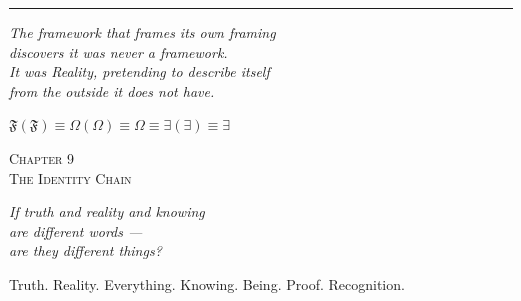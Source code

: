 \documentclass[10pt, openany, oneside]{book}
\renewcommand{\large}{\fontsize{11.5}{14}\selectfont}
\renewcommand{\huge}{\fontsize{17}{21}\selectfont}
\begin{document}
\begin{center}
    \rule{0.15\textwidth}{0.3pt}
\end{center}

\vspace{0.5em}

\begin{center}
    \itshape
    The framework that frames its own framing\\
    discovers it was never a framework.\\[0.8em]
    It was Reality, pretending to describe itself\\
    from the outside it does not have.
\end{center}

\vspace{0.5em}

\begin{center}
    $\mathfrak{F}(\mathfrak{F}) \equiv \Omega(\Omega) \equiv \Omega \equiv \exists(\exists) \equiv \exists$
\end{center}


%
%
%

\newpage

\begin{center}
    {\huge\scshape Chapter 9}\\[0.3em]
    {\large\scshape The Identity Chain}
\end{center}

\vspace{1.5em}

\begin{center}
    \itshape
    If truth and reality and knowing\\
    are different words ---\\
    are they different things?
\end{center}

\vspace{2em}


\noindent Truth. Reality. Everything. Knowing. Being. Proof. Recognition.
\end{document}
